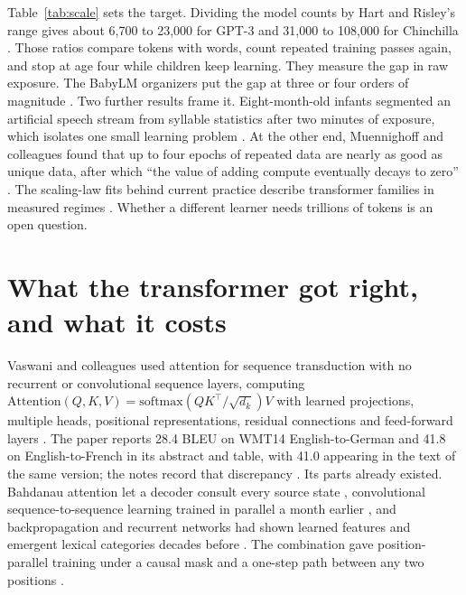 Table~\ref{tab:scale} sets the target. Dividing the model counts by Hart and Risley's range gives about 6,700 to 23,000 for GPT-3 and 31,000 to 108,000 for Chinchilla \cite{pre45,pre55,pre54}. Those ratios compare tokens with words, count repeated training passes again, and stop at age four while children keep learning. They measure the gap in raw exposure. The BabyLM organizers put the gap at three or four orders of magnitude \cite{post81}. Two further results frame it. Eight-month-old infants segmented an artificial speech stream from syllable statistics after two minutes of exposure, which isolates one small learning problem \cite{pre57}. At the other end, Muennighoff and colleagues found that up to four epochs of repeated data are nearly as good as unique data, after which ``the value of adding compute eventually decays to zero'' \cite{post86}. The scaling-law fits behind current practice describe transformer families in measured regimes \cite{pre53,pre54}. Whether a different learner needs trillions of tokens is an open question.

\section{What the transformer got right, and what it costs}
Vaswani and colleagues used attention for sequence transduction with no recurrent or convolutional sequence layers, computing $\mathrm{Attention}(Q,K,V)=\mathrm{softmax}(QK^\top/\sqrt{d_k})V$ with learned projections, multiple heads, positional representations, residual connections and feed-forward layers \cite{pre52}. The paper reports 28.4 BLEU on WMT14 English-to-German and 41.8 on English-to-French in its abstract and table, with 41.0 appearing in the text of the same version; the notes record that discrepancy \cite{pre52}. Its parts already existed. Bahdanau attention let a decoder consult every source state \cite{pre22}, convolutional sequence-to-sequence learning trained in parallel a month earlier \cite{pre51}, and backpropagation and recurrent networks had shown learned features and emergent lexical categories decades before \cite{pre58,pre59}. The combination gave position-parallel training under a causal mask and a one-step path between any two positions \cite{pre52}.

